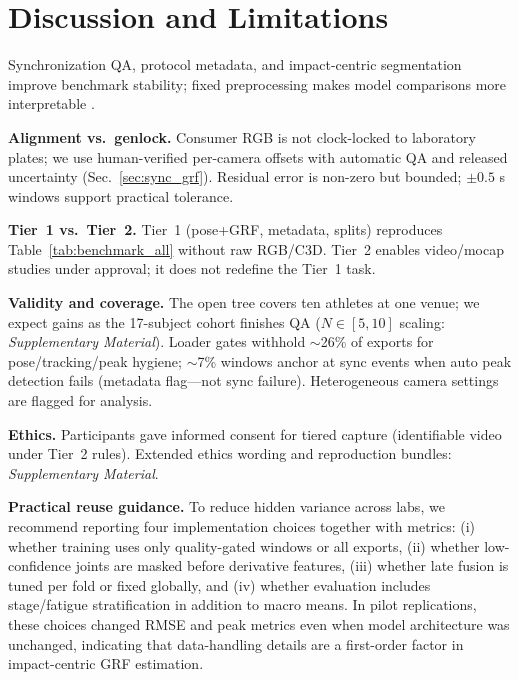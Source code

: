 \documentclass[sigconf,screen]{acmart}
\newcommand{\BadmintonGRFSupplementary}{\emph{Supplementary Material}}
\newcommand{\QAabbrev}{QA}
\begin{document}

\section{Discussion and Limitations}
\label{sec:limitations}
Synchronization \QAabbrev{}, protocol metadata, and impact-centric segmentation improve benchmark stability; fixed preprocessing makes model comparisons more interpretable \cite{evansSynchronisedVideoMotion2024,hebert-losierReportingGuidelinesRunning2023}.

\noindent\textbf{Alignment vs.\ genlock.}
Consumer RGB is not clock-locked to laboratory plates; we use human-verified per-camera offsets with automatic \QAabbrev{} and released uncertainty (Sec.~\ref{sec:sync_grf}). Residual error is non-zero but bounded; \(\pm0.5\) s windows support practical tolerance.

\noindent\textbf{Tier~1 vs.\ Tier~2.}
Tier~1 (pose+GRF, metadata, splits) reproduces Table~\ref{tab:benchmark_all} without raw RGB/C3D. Tier~2 enables video/mocap studies under approval; it does not redefine the Tier~1 task.

\noindent\textbf{Validity and coverage.}
The open tree covers ten athletes at one venue; we expect gains as the 17-subject cohort finishes \QAabbrev{} (\(N\!\in\![5,10]\) scaling: \BadmintonGRFSupplementary). Loader gates withhold \(\sim\)26\% of exports for pose/tracking/peak hygiene; \(\sim\)7\% windows anchor at sync events when auto peak detection fails (metadata flag---not sync failure). Heterogeneous camera settings are flagged for analysis.

\noindent\textbf{Ethics.}
Participants gave informed consent for tiered capture (identifiable video under Tier~2 rules). Extended ethics wording and reproduction bundles: \BadmintonGRFSupplementary{}.

\noindent\textbf{Practical reuse guidance.}
To reduce hidden variance across labs, we recommend reporting four implementation choices together with metrics: (i) whether training uses only quality-gated windows or all exports, (ii) whether low-confidence joints are masked before derivative features, (iii) whether late fusion is tuned per fold or fixed globally, and (iv) whether evaluation includes stage/fatigue stratification in addition to macro means.
In pilot replications, these choices changed RMSE and peak metrics even when model architecture was unchanged, indicating that data-handling details are a first-order factor in impact-centric GRF estimation.
\end{document}
